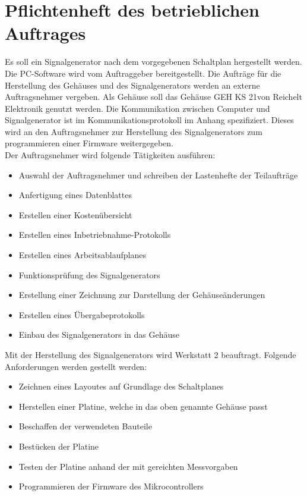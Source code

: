 \section[Pflichtenheft betriebl. Auftrag]{Pflichtenheft des betrieblichen Auftrages}
Es soll ein Signalgenerator nach dem vorgegebenen Schaltplan hergestellt werden. Die PC-Software wird vom Auftraggeber bereitgestellt. Die Aufträge für die Herstellung des Gehäuses und des Signalgenerators werden an externe Auftragsnehmer vergeben. Als Gehäuse soll das Gehäuse \glqq GEH KS 21\grqq von Reichelt Elektronik genutzt werden. Die Kommunikation zwischen Computer und Signalgenerator ist im Kommunikationsprotokoll im Anhang spezifiziert. Dieses wird an den Auftragsnehmer zur Herstellung des Signalgenerators zum programmieren einer Firmware weitergegeben.\\
\bigskip
Der Auftragsnehmer wird folgende Tätigkeiten ausführen:
\begin{itemize}
\item Auswahl der Auftragsnehmer und schreiben der Lastenhefte der Teilaufträge
\item Anfertigung eines Datenblattes
\item Erstellen einer Kostenübersicht
\item Erstellen eines Inbetriebnahme-Protokolls
\item Erstellen eines Arbeitsablaufplanes
\item Funktionsprüfung des Signalgenerators
\item Erstellung einer Zeichnung zur Darstellung der Gehäuseänderungen
\item Erstellen eines Übergabeprotokolls
\item Einbau des Signalgenerators in das Gehäuse
\end{itemize}
\bigskip
Mit der Herstellung des Signalgenerators wird Werkstatt 2 beauftragt. Folgende Anforderungen werden gestellt werden:\\
\begin{itemize}
\item Zeichnen eines Layoutes auf Grundlage des Schaltplanes
\item Herstellen einer Platine, welche in das oben genannte Gehäuse passt
\item Beschaffen der verwendeten Bauteile
\item Bestücken der Platine
\item Testen der Platine anhand der mit gereichten Messvorgaben
\item Programmieren der Firmware des Mikrocontrollers
\end{itemize}
